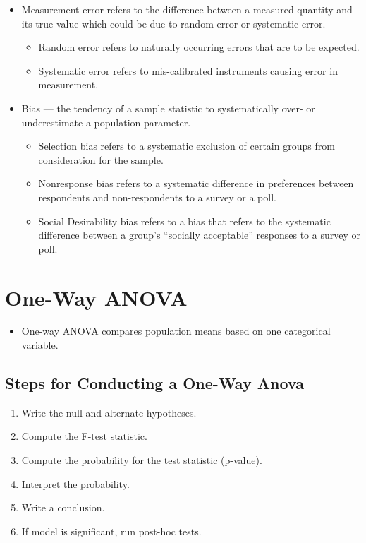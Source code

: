 \documentclass[
  letterpaper,
  DIV=11,
  numbers=noendperiod]{scrreprt}
\providecommand{\tightlist}{%
  \setlength{\itemsep}{0pt}\setlength{\parskip}{0pt}}\usepackage{longtable,booktabs,array}
\begin{document}
\begin{itemize}
\tightlist
\item
  Measurement error refers to the difference between a measured quantity
  and its true value which could be due to random error or systematic
  error.

  \begin{itemize}
  \tightlist
  \item
    Random error refers to naturally occurring errors that are to be
    expected.
  \item
    Systematic error refers to mis-calibrated instruments causing error
    in measurement.
  \end{itemize}
\item
  Bias --- the tendency of a sample statistic to systematically over- or
  underestimate a population parameter.

  \begin{itemize}
  \tightlist
  \item
    Selection bias refers to a systematic exclusion of certain groups
    from consideration for the sample.
  \item
    Nonresponse bias refers to a systematic difference in preferences
    between respondents and non-respondents to a survey or a poll.
  \item
    Social Desirability bias refers to a bias that refers to the
    systematic difference between a group's ``socially acceptable''
    responses to a survey or poll.
  \end{itemize}
\end{itemize}


\chapter{One-Way ANOVA}\label{one-way-anova}

\begin{itemize}
\tightlist
\item
  One-way ANOVA compares population means based on one categorical
  variable.
\end{itemize}

\section{Steps for Conducting a One-Way
Anova}\label{steps-for-conducting-a-one-way-anova}

\begin{enumerate}
\def\labelenumi{\arabic{enumi}.}
\tightlist
\item
  Write the null and alternate hypotheses.
\item
  Compute the F-test statistic.
\item
  Compute the probability for the test statistic (p-value).
\item
  Interpret the probability.
\item
  Write a conclusion.
\item
  If model is significant, run post-hoc tests.
\end{enumerate}
\end{document}
